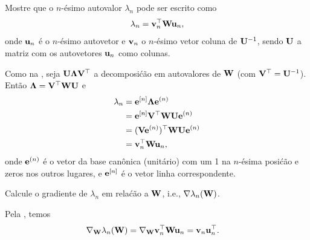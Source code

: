 \begin{exenumerate}
    \item Mostre que o $n$-\'esimo autovalor $\lambda_n$ pode ser escrito como
    \begin{equation}
        \lambda_n=\mathbf{v}_n^\top \mathbf{W} \mathbf{u}_n,
    \end{equation}
    onde $\mathbf{u}_n$ \'e o $n$-\'esimo autovetor e $\mathbf{v}_n$ o $n$-\'esimo vetor coluna de $\mathbf{U}^{-1}$, sendo $\mathbf{U}$ a matriz com os autovetores $\mathbf{u}_n$ como colunas.
    
    \begin{solution}
        Como na , seja $\mathbf{U}\mathbf{\Lambda} \mathbf{V}^\top$ a
        decomposi\'c\~ao em autovalores de $\mathbf{W}$ (com $\mathbf{V}^\top = \mathbf{U}^{-1}$). Ent\~ao $\mathbf{\Lambda} = \mathbf{V}^\top
        \mathbf{W}\mathbf{U}$ e
        \begin{align}
            \lambda_n &= \mathbf{e}^{[n]}\mathbf{\Lambda}\mathbf{e}^{(n)} \\
            &= \mathbf{e}^{[n]}\mathbf{V}^\top \mathbf{W} \mathbf{U}\mathbf{e}^{(n)} \\
            &= (\mathbf{V}\mathbf{e}^{(n)})^\top \mathbf{W}\mathbf{U}\mathbf{e}^{(n)} \\
            &= \mathbf{v}_n^\top \mathbf{W}\mathbf{u}_n,
        \end{align}
        onde $\mathbf{e}^{(n)}$ \'e o vetor da base can\^onica (unit\'ario) com um 1 na $n$-\'esima
        posi\'c\~ao e zeros nos outros lugares, e $\mathbf{e}^{[n]}$ \'e o vetor linha correspondente.
    \end{solution}
    
    \item Calcule o gradiente de $\lambda_n$ em rela\'c\~ao a $\mathbf{W}$, i.e., $\nabla \lambda_n(\mathbf{W})$.
    
    \begin{solution}
        Pela , temos
        \begin{align}
            \nabla_{\mathbf{W}} \lambda_n(\mathbf{W}) &= \nabla_{\mathbf{W}} \mathbf{v}_n^\top \mathbf{W} \mathbf{u}_n = \mathbf{v}_n \mathbf{u}_n^\top.
        \end{align}
    \end{solution}
    

\end{exenumerate}
